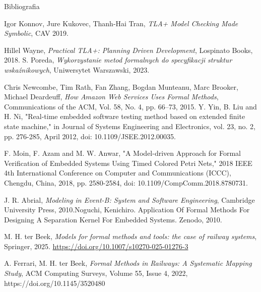 \documentclass{purdue-poster}
\begin{document}
\begin{frame}{}
\begin{columns}[T]
\begin{column}{.48\linewidth}
\begin{block}{\large Bibliografia}
{\begin{thebibliography}{00}
            Igor Konnov, Jure Kukovec, Thanh-Hai Tran, \emph{TLA+ Model Checking Made Symbolic}, CAV 2019.
        
            Hillel Wayne, \emph{Practical TLA+: Planning Driven Development}, Lospinato Books, 2018.
            S. Poreda,
            \textit{Wykorzystanie metod formalnych do specyfikacji struktur wskaźnikowych},
            Uniwersytet Warszawski, 2023.

            Chris Newcombe, Tim Rath, Fan Zhang, Bogdan Munteanu, Marc Brooker, Michael Deardeuff, \emph{How Amazon Web Services Uses Formal Methods}, Communications of the ACM, Vol. 58, No. 4, pp. 66--73, 2015.
            Y. Yin, B. Liu and H. Ni, "Real-time embedded software testing method based on extended finite state machine," in Journal of Systems Engineering and Electronics, vol. 23, no. 2, pp. 276-285, April 2012, doi: 10.1109/JSEE.2012.00035.
            
            F. Moin, F. Azam and M. W. Anwar, "A Model-driven Approach for Formal Verification of Embedded Systems Using Timed Colored Petri Nets," 2018 IEEE 4th International Conference on Computer and Communications (ICCC), Chengdu, China, 2018, pp. 2580-2584, doi: 10.1109/CompComm.2018.8780731.

            J. R. Abrial, \emph{Modeling in Event-B: System and Software Engineering}, Cambridge University Press, 2010.Noguchi, Kenichiro. Application Of Formal Methods For Designing A Separation Kernel For Embedded Systems. Zenodo, 2010.

            M. H. ter Beek, \emph{Models for formal methods and tools: the case of railway systems}, Springer, 2025.
            \url{https://doi.org/10.1007/s10270-025-01276-3}
        
            A. Ferrari, M. H. ter Beek, \emph{Formal Methods in Railways: A Systematic Mapping Study}, ACM Computing Surveys, Volume 55, Issue 4, 2022, https://doi.org/10.1145/3520480
        \end{thebibliography}
        }
    \end{block}
    \end{column}
    \end{columns}
    \vfill
\end{frame}
\end{document}
